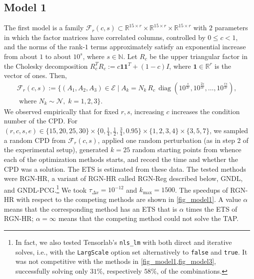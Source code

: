 \documentclass[a4paper,10pt,final]{siamart1116}
\newcommand{\Var}[1]{\mathcal{#1}}
\newcommand{\vect}[1]{\mathbf{#1}}
\newcommand{\R}{\mathbb{R}}
\newcommand{\reffig}[1]{{\cref{#1}}}
\numberwithin{equation}{section}
\numberwithin{figure}{section}
\numberwithin{table}{section}
\numberwithin{theorem}{section}
\begin{document}
\subsection{Model 1}\label{sec_model1}
The first model is a family {$\Var{F}_{r}(c,s)\subset \R^{15\times r} \times \R^{15\times r}\times \R^{15\times r}$} with $2$ parameters in which the factor matrices have correlated columns, controlled by $0 \le c < 1$, and the norms of the rank-$1$ terms approximately satisfy an exponential increase from about $1$ to about $10^s$, where $s \in \mathbb{N}$. Let $R_c$ be the upper triangular factor in the Cholesky decomposition $R_c^T R_c := c \vect{1} \vect{1}^T + (1-c) I$, where $\vect{1} \in \R^r$ is the vector of ones. Then,
\begin{multline*} %
 \Var{F}_{r}(c,s) := \bigl\{ (A_1, A_2, A_3) \in \Var{E} \;|\;
 A_k = N_k \, R_c \, \operatorname{diag}( 10^{\frac{s}{3r }}, 10^{\frac{2 s}{3r }}, \ldots, 10^{\frac{rs}{3r }} ), \\ \text{ where } N_k \sim \Var{N},\; k = 1, 2, 3 \bigr\}.
\end{multline*}
We observed empirically that for fixed $r,s$, increasing $c$ increases the condition number of the CPD. For $(r,c,s,e) \in \{ 15, 20, 25, 30 \} \times \{0, \tfrac{1}{4}, \tfrac{1}{2}, \tfrac{3}{4}, 0.95\} \times \{1, 2, 3, 4\} \times \{3,5,7\}$, we sampled a random CPD from $\Var{F}_{r}(c,s)$, applied one random perturbation (as in step 2 of the experimental setup), generated $k = 25$ random starting points from whence each of the optimization methods starts, and record the time and whether the CPD was a solution. The ETS is estimated from these data. The tested methods were RGN-HR, a variant of RGN-HR called RGN-Reg {described below}, GNDL, and GNDL-PCG.\footnote{In fact, we also tested Tensorlab's \texttt{nls\_lm} with both direct and iterative solves, i.e., with the \texttt{LargScale} option set alternatively to \texttt{false} and \texttt{true}. It was not competitive with the methods in \cref{fig_model1,fig_model3}, successfully solving only $31\%$, respectively $58\%$, of the combinations.} We took $\tau_{\Delta x} = 10^{-12}$ and $k_{\max} = 1500$. The speedups of RGN-HR with respect to the competing methods are shown in \reffig{fig_model1}. A value $\alpha$ means that the corresponding method has an ETS that is $\alpha$ times the ETS of RGN-HR; $\alpha=\infty$ means that the competing method could not solve the TAP. %
\end{document}
